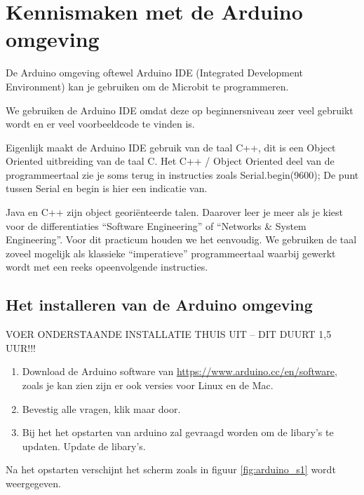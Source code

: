 
\section{Kennismaken met de Arduino omgeving}

De Arduino omgeving oftewel Arduino IDE (Integrated Development Environment) kan je gebruiken om de Microbit te programmeren. 

We gebruiken de Arduino IDE omdat deze op beginnersniveau zeer veel gebruikt wordt en er veel voorbeeldcode te vinden is.
 
Eigenlijk maakt de Arduino IDE gebruik van de taal C++, dit is een Object Oriented uitbreiding van de taal C. Het C++ / Object Oriented deel van de programmeertaal zie je soms terug in instructies zoals Serial.begin(9600); De punt tussen Serial en begin is hier een indicatie van.

Java en C++ zijn object georiënteerde talen. Daarover leer je meer als je kiest voor de differentiaties “Software Engineering” of “Networks \& System Engineering”. Voor dit practicum houden we het eenvoudig. We gebruiken de taal zoveel mogelijk als klassieke “imperatieve” programmeertaal waarbij gewerkt wordt met een reeks opeenvolgende instructies.



\subsection{Het installeren van de Arduino omgeving}

VOER ONDERSTAANDE INSTALLATIE THUIS UIT – DIT DUURT 1,5 UUR!!!

\begin{enumerate}
	\item Download de Arduino software van \href{https://www.arduino.cc/en/software}{https://www.arduino.cc/en/software}, zoals je kan zien zijn er ook versies voor Linux en de Mac.
	\item  Bevestig alle vragen, klik maar door.
	\item Bij het het opstarten van arduino zal gevraagd worden om de libary's te updaten. Update de libary's.
\end{enumerate}
Na het opstarten verschijnt het scherm zoals in figuur \ref{fig:arduino_s1} wordt weergegeven.

